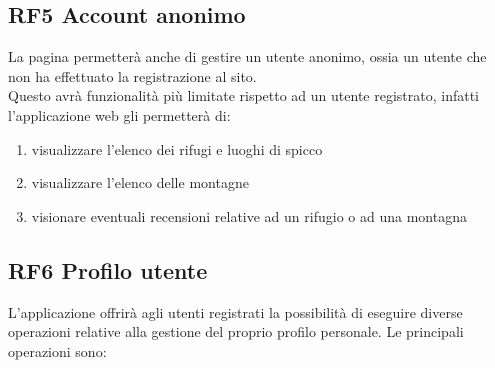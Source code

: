 \documentclass[a4paper,12pt]{article}
\begin{document}
 \subsection*{RF5 Account anonimo}
 La pagina permetterà anche di gestire un utente anonimo, ossia un utente che non ha effettuato la registrazione al sito.\\
 Questo avrà funzionalità più limitate rispetto ad un utente registrato, infatti l'applicazione web gli permetterà di:
 \begin{enumerate} [leftmargin=40pt]
  \item visualizzare l'elenco dei rifugi e luoghi di spicco
  \item visualizzare l'elenco delle montagne
  \item visionare eventuali recensioni relative ad un rifugio o ad una montagna
\end{enumerate}

 
\subsection*{RF6 Profilo utente}
L'applicazione offrirà agli utenti registrati la possibilità di eseguire diverse operazioni relative alla gestione del proprio profilo personale. Le principali operazioni sono: 
\end{document}
